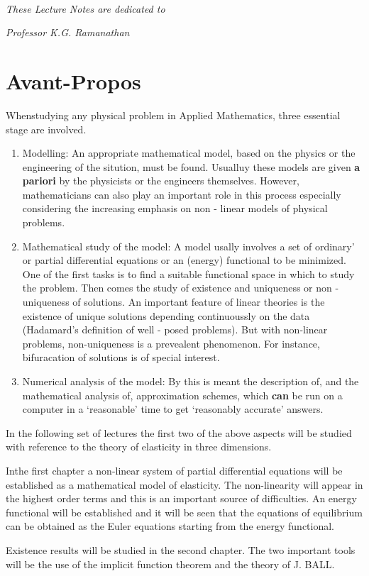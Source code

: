 ~
\thispagestyle{empty}

\vfill

\hfill {\em These Lecture Notes are dedicated to}

\hfill {\em Professor K.G. Ramanathan}

\vfill

\eject


\chapter*{Avant-Propos}



When\pageoriginale studying any physical problem in Applied Mathematics, three
essential stage are involved. 
\begin{enumerate}
\item Modelling: An appropriate mathematical model, based on the
  physics or the engineering of the sitution, must be found. Usualluy
  these models are given  \textbf {a pariori} by the physicists or
  the engineers themselves. However, mathematicians can also play an
  important role in this process especially considering the increasing
  emphasis on non - linear models of physical problems. 
\item Mathematical study of the model: A model usally involves a set
  of ordinary' or partial differential equations or an (energy)
  functional to be minimized. One of the first tasks is to find a
  suitable functional space in which to study the problem. Then comes
  the study of existence and uniqueness or non -uniqueness of
  solutions. An important feature of linear theories is the existence
  of unique solutions depending continuoussly on the data (Hadamard's
  definition of well - posed problems). But with non-linear problems,
  non-uniqueness is a prevealent phenomenon. For instance,
  bifuracation of solutions is of special interest. 
\item Numerical analysis of the model: By this is meant the
  description of, and the mathematical analysis of, approximation
  schemes, which \textbf{can} be run on a computer in a `reasonable'
  time to get `reasonably accurate' answers. 
\end{enumerate}

In the following set of lectures the first two of the above aspects
will be studied with reference to the theory of elasticity in three
dimensions. 

In\pageoriginale  the first chapter a non-linear system of partial differential
equations will be established as a mathematical model of
elasticity. The non-linearity will appear in the highest order terms
and this is an important source of difficulties. An energy functional
will be established and it will be seen that the equations of
equilibrium can be obtained as the Euler equations starting from the
energy functional. 

Existence results will be studied in the second chapter. The two
important tools will be the use of the implicit function theorem and
the theory of J. BALL. 
